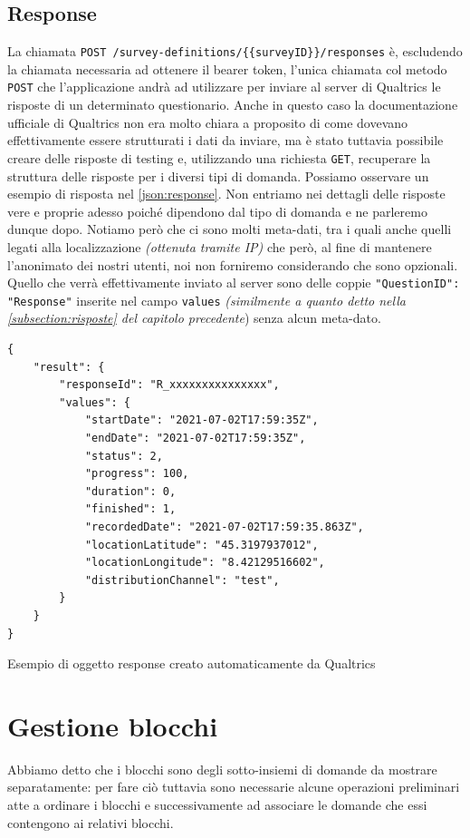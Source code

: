\subsection{Response}
La chiamata \texttt{POST /survey-definitions/\{\{surveyID\}\}/responses} è, escludendo la chiamata necessaria ad ottenere il bearer token, l'unica chiamata col metodo \texttt{POST} che l'applicazione andrà ad utilizzare per inviare al server di Qualtrics le risposte di un determinato questionario.
Anche in questo caso la documentazione ufficiale di Qualtrics non era molto chiara a proposito di come dovevano effettivamente essere strutturati i dati da inviare, ma è stato tuttavia possibile creare delle risposte di testing e, utilizzando una richiesta \texttt{GET}, recuperare la struttura delle risposte per i diversi tipi di domanda. Possiamo osservare un esempio di risposta nel \autoref{json:response}. Non entriamo nei dettagli delle risposte vere e proprie adesso poiché dipendono dal tipo di domanda e ne parleremo dunque dopo. Notiamo però che ci sono molti meta-dati, tra i quali anche quelli legati alla localizzazione \textit{(ottenuta tramite IP)} che però, al fine di mantenere l'anonimato dei nostri utenti, noi non forniremo considerando che sono opzionali. Quello che verrà effettivamente inviato al server sono delle coppie \texttt{"QuestionID": "Response"} inserite nel campo \texttt{values} \textit{(similmente a quanto detto nella \autoref{subsection:risposte} del capitolo precedente}) senza alcun meta-dato.

\begin{json}
\begin{verbatim}
{
    "result": {
        "responseId": "R_xxxxxxxxxxxxxxx",
        "values": {
            "startDate": "2021-07-02T17:59:35Z",
            "endDate": "2021-07-02T17:59:35Z",
            "status": 2,
            "progress": 100,
            "duration": 0,
            "finished": 1,
            "recordedDate": "2021-07-02T17:59:35.863Z",
            "locationLatitude": "45.3197937012",
            "locationLongitude": "8.42129516602",
            "distributionChannel": "test",
        }
    }
}
\end{verbatim}
\caption{Esempio di oggetto response creato automaticamente da Qualtrics}
\label{json:response}
\end{json}

\newpage
\section{Gestione blocchi}
Abbiamo detto che i blocchi sono degli sotto-insiemi di domande da mostrare separatamente: per fare ciò tuttavia sono necessarie alcune operazioni preliminari atte a ordinare i blocchi e successivamente ad associare le domande che essi contengono ai relativi blocchi.

